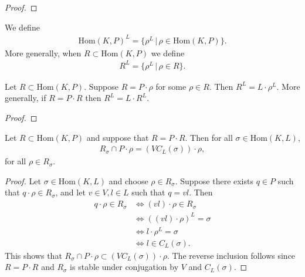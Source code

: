 \begin{lemma}
\end{lemma}
\begin{proof}
\end{proof}

\begin{definition} We define
	\begin{align*}
		\mathrm{Hom}(K, P)^L = \{\rho^L\,|\,\rho \in \mathrm{Hom}(K, P)\}.
	\end{align*}
	More generally, when $R \subset \mathrm{Hom}(K, P)$ we define
	\begin{align*}
		R^L = \{\rho^L\,|\,\rho \in R\}.
	\end{align*}
\end{definition}

\begin{lemma} \label{pr:lrl} Let $R \subset \mathrm{Hom}(K, P)$. Suppose $R = P \cdot \rho$ for some $\rho \in R$. Then $R^L = L\cdot \rho^L$.
	More generally, if $R = P \cdot R$ then $R^L = L \cdot R^L$.
\end{lemma}
\begin{proof}
\end{proof}

\begin{lemma} \label{rsigma:vcl} Let $R \subset \mathrm{Hom}(K, P)$ and suppose that $R = P \cdot R$. Then for all $\sigma \in \mathrm{Hom}(K, L)$,
	\begin{align*}
		R_\sigma \cap P \cdot \rho = \left(VC_L(\sigma)\right) \cdot \rho,
	\end{align*}
	for all $\rho \in R_\sigma$.
\end{lemma}
\begin{proof}
	Let $\sigma \in \mathrm{Hom}(K, L)$ and choose $\rho \in R_\sigma$. Suppose there exists $q \in P$ such that $q \cdot \rho \in R_\sigma$, and let $v \in V, l \in L$ such that $q = vl$. Then
	\begin{align*}
		q \cdot \rho \in R_\sigma &\Leftrightarrow (vl) \cdot \rho \in R_\sigma \\
		&\Leftrightarrow \left( (vl) \cdot \rho\right)^L = \sigma \\
		&\Leftrightarrow l\cdot \rho^L = \sigma \\
		&\Leftrightarrow l \in C_L(\sigma).
	\end{align*}
	This shows that $R_\sigma \cap P \cdot \rho \subset \left(VC_L(\sigma)\right) \cdot \rho$. The reverse inclusion follows since $R = P \cdot R$ and $R_\sigma$ is stable under conjugation by $V$ and $C_L(\sigma)$.
\end{proof}

